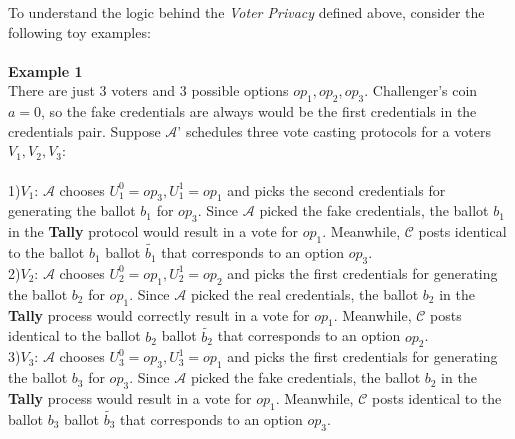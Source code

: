 To understand the logic behind the \textit{Voter Privacy} defined above, consider the following toy examples:\\\\
\textbf{Example 1}\\
There are just 3 voters and 3 possible options $op_1,op_2,op_3$. Challenger's coin $a=0$, so the fake credentials are always would be the first credentials in the credentials pair.
Suppose  $\mathcal{A}$' schedules three vote casting protocols for a voters $V_1,V_2,V_3$: \\\\
1)$\boxed{V_1}$:  $\mathcal{A}$ chooses $U^0_1 = op_3, U^1_1 = op_1$ and picks the second credentials for generating the ballot $b_1$ for $op_3$. Since  $\mathcal{A}$ picked the fake credentials, the ballot $b_1$ in the \textbf{Tally} protocol would result in a vote for $op_1$. Meanwhile, $\mathcal{C}$ posts identical to the ballot $b_1$ ballot $\tilde{b_1}$ that corresponds to an option $op_3$.\\
2)$\boxed{V_2}$: $\mathcal{A}$ chooses $U^0_2 = op_1, U^1_2 = op_2$ and picks the first credentials for generating the ballot $b_2$ for $op_1$. Since  $\mathcal{A}$ picked the real credentials, the ballot $b_2$ in the \textbf{Tally} process would correctly result in a vote for $op_1$. Meanwhile, $\mathcal{C}$ posts identical to the ballot $b_2$ ballot $\tilde{b_2}$ that corresponds to an option $op_2$.\\
3)$\boxed{V_3}$:  $\mathcal{A}$ chooses $U^0_3 = op_3, U^1_3 = op_1$ and picks the first credentials for generating the ballot $b_3$ for $op_3$. Since  $\mathcal{A}$ picked the fake credentials, the ballot $b_2$ in the \textbf{Tally} process would  result in a vote for $op_1$. Meanwhile, $\mathcal{C}$ posts identical to the ballot $b_3$ ballot $\tilde{b_3}$ that corresponds to an option $op_3$.\\

